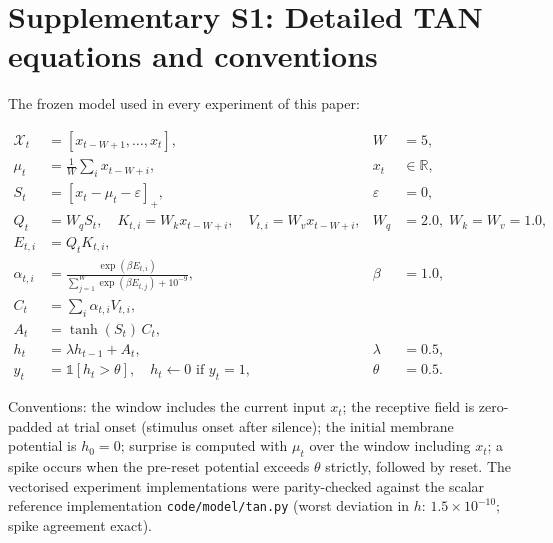 \section{Supplementary S1: Detailed TAN equations and conventions}

The frozen model used in every experiment of this paper:

\begin{align}
  \mathcal{X}_t &= [x_{t-W+1},\dots,x_t], & W &= 5,\\
  \mu_t &= \tfrac1W \textstyle\sum_i x_{t-W+i}, & x_t &\in \mathbb{R},\\
  S_t &= [x_t - \mu_t - \varepsilon]_+, & \varepsilon &= 0,\\
  Q_t &= W_q S_t,\quad K_{t,i}=W_k x_{t-W+i},\quad V_{t,i}=W_v x_{t-W+i},
    & W_q&=2.0,\; W_k=W_v=1.0,\\
  E_{t,i} &= Q_t K_{t,i}, & &\\
  \alpha_{t,i} &= \frac{\exp(\beta E_{t,i})}{\sum_{j=1}^W
    \exp(\beta E_{t,j}) + 10^{-9}}, & \beta &= 1.0,\\
  C_t &= \textstyle\sum_i \alpha_{t,i} V_{t,i}, & &\\
  A_t &= \tanh(S_t)\,C_t, & &\\
  h_t &= \lambda h_{t-1} + A_t, & \lambda &= 0.5,\\
  y_t &= \mathbb{1}[h_t > \theta],\quad h_t \leftarrow 0 \text{ if }
    y_t = 1, & \theta &= 0.5 .
\end{align}

Conventions: the window includes the current input $x_t$; the receptive
field is zero-padded at trial onset (stimulus onset after silence); the
initial membrane potential is $h_0 = 0$; surprise is computed with
$\mu_t$ over the window including $x_t$; a spike occurs when the
pre-reset potential exceeds $\theta$ strictly, followed by reset.  The
vectorised experiment implementations were parity-checked against the
scalar reference implementation \texttt{code/model/tan.py} (worst deviation in
$h$: $1.5\times10^{-10}$; spike agreement exact).

